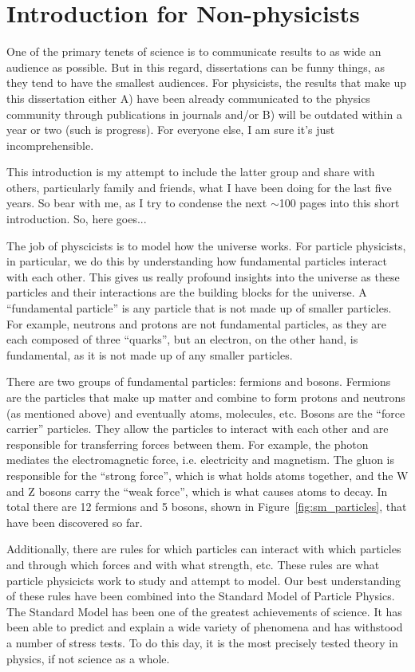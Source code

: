 \chapter{Introduction for Non-physicists}

One of the primary tenets of science is to communicate results to as wide an audience as possible.
But in this regard, dissertations can be funny things, as they tend to have the smallest audiences.
For physicists, the results that make up this dissertation either A) have been already communicated to the physics community through publications in journals and/or B) will be outdated within a year or two (such is progress).
For everyone else, I am sure it's just incomprehensible.

This introduction is my attempt to include the latter group and share with others, particularly family and friends, what I have been doing for the last five years.
So bear with me, as I try to condense the next $\sim$100 pages into this short introduction.
So, here goes...

The job of physcicists is to model how the universe works.
For particle physicists, in particular, we do this by understanding how fundamental particles interact with each other.
This gives us really profound insights into the universe as these particles and their interactions are the building blocks for the universe.
A ``fundamental particle'' is any particle that is not made up of smaller particles.
For example, neutrons and protons are not fundamental particles, as they are each composed of three ``quarks'', but an electron, on the other hand, is fundamental, as it is not made up of any smaller particles. 

There are two groups of fundamental particles: fermions and bosons.
Fermions are the particles that make up matter and combine to form protons and neutrons (as mentioned above) and eventually atoms, molecules, etc.
Bosons are the ``force carrier'' particles.
They allow the particles to interact with each other and are responsible for transferring forces between them.
For example, the photon mediates the electromagnetic force, i.e. electricity and magnetism.
The gluon is responsible for the ``strong force'', which is what holds atoms together, and the W and Z bosons carry the ``weak force'', which is what causes atoms to decay.
In total there are 12 fermions and 5 bosons, shown in Figure~\ref{fig:sm_particles}, that have been discovered so far.

Additionally, there are rules for which particles can interact with which particles and through which forces and with what strength, etc.
These rules are what particle physicicts work to study and attempt to model.
Our best understanding of these rules have been combined into the Standard Model of Particle Physics.
The Standard Model has been one of the greatest achievements of science.
It has been able to predict and explain a wide variety of phenomena and has withstood a number of stress tests.
To do this day, it is the most precisely tested theory in physics, if not science as a whole.

